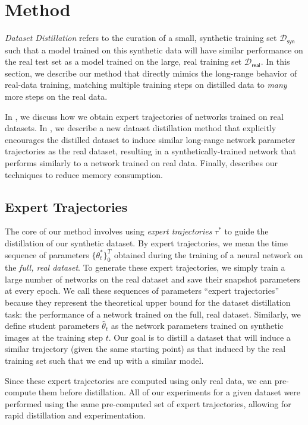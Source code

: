 \documentclass[main.tex]{subfiles}
\begin{document}
\section{Method}
\emph{Dataset Distillation} refers to the curation of a small, synthetic training set $\mathcal{D}_\mathsf{syn}$ such that a model trained on this synthetic data will have similar performance on the real test set as a model trained on the large, real training set $\mathcal{D}_\mathsf{real}$. In this section, we describe our method that directly mimics the long-range behavior of real-data training, matching multiple training steps on distilled data to \textit{many} more steps on the real data.



In , we discuss how we obtain expert trajectories of networks trained on real datasets. In , we describe a new dataset distillation method that explicitly encourages the distilled dataset to induce similar long-range network parameter trajectories as the real dataset, resulting in a synthetically-trained network that performs similarly to a network trained on real data. Finally,  describes our techniques to reduce memory consumption.


\subsection{Expert Trajectories}
The core of our method involves using \emph{expert trajectories} $\tau^*$ to guide the distillation of our synthetic dataset. By expert trajectories, we mean the time sequence of parameters $\{\theta^*_t\}_0^T$ obtained during the training of a neural network on the \emph{full, real dataset}. To generate these expert trajectories, we simply train a large number of networks on the real dataset and save their snapshot parameters at every epoch. We call these sequences of parameters ``expert trajectories'' because they represent the theoretical upper bound for the dataset distillation task: the performance of a network trained on the full, real dataset. Similarly, we define student parameters $\hat{\theta}_t$ as the network parameters trained on synthetic images at the training step $t$. Our goal is to distill a dataset that will induce a similar trajectory (given the same starting point) as that induced by the real training set such that we end up with a similar model.

Since these expert trajectories are computed using only real data, we can pre-compute them before distillation. All of our experiments for a given dataset were performed using the same pre-computed set of expert trajectories, allowing for rapid distillation and experimentation.
\end{document}
